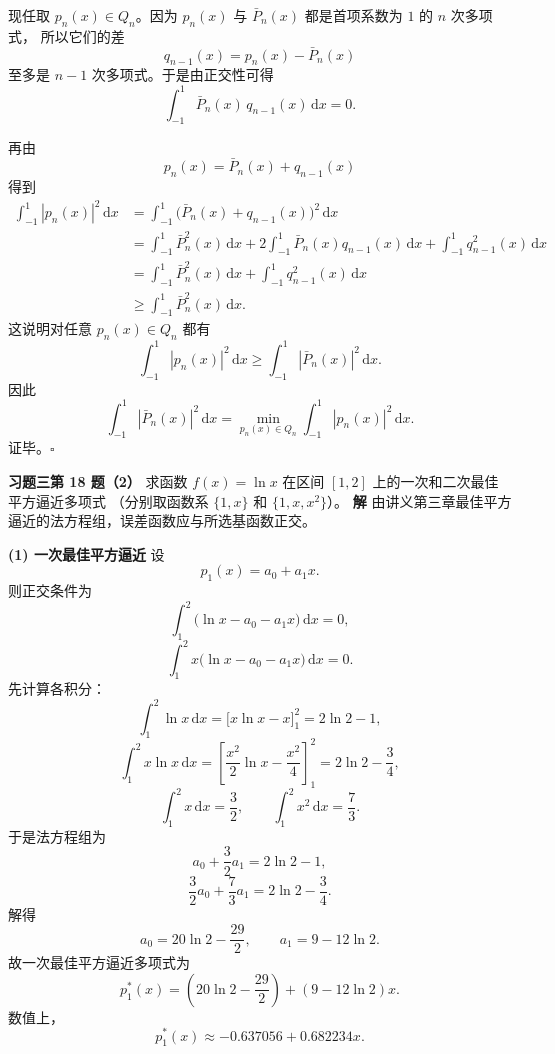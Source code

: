 \documentclass[UTF8,a4paper,11pt]{ctexart}
\newcommand*{\QED}{\hfill\ensuremath{\square}}
\begin{document}
现任取 $p_n(x)\in Q_n$。因为 $p_n(x)$ 与 $\bar P_n(x)$ 都是首项系数为 $1$ 的 $n$ 次多项式，
所以它们的差
\[
  q_{n-1}(x)=p_n(x)-\bar P_n(x)
\]
至多是 $n-1$ 次多项式。于是由正交性可得
\[
  \int_{-1}^1 \bar P_n(x)\,q_{n-1}(x)\,\mathrm{d}x=0.
\]

再由
\[
  p_n(x)=\bar P_n(x)+q_{n-1}(x)
\]
得到
\begin{align*}
  \int_{-1}^1 |p_n(x)|^2\,\mathrm{d}x
  &=\int_{-1}^1 \bigl(\bar P_n(x)+q_{n-1}(x)\bigr)^2\,\mathrm{d}x \\
  &=\int_{-1}^1 \bar P_n^2(x)\,\mathrm{d}x
    +2\int_{-1}^1 \bar P_n(x)q_{n-1}(x)\,\mathrm{d}x
    +\int_{-1}^1 q_{n-1}^2(x)\,\mathrm{d}x \\
  &=\int_{-1}^1 \bar P_n^2(x)\,\mathrm{d}x+\int_{-1}^1 q_{n-1}^2(x)\,\mathrm{d}x \\
  &\ge \int_{-1}^1 \bar P_n^2(x)\,\mathrm{d}x.
\end{align*}
这说明对任意 $p_n(x)\in Q_n$ 都有
\[
  \int_{-1}^1 |p_n(x)|^2\,\mathrm{d}x
  \ge
  \int_{-1}^1 |\bar P_n(x)|^2\,\mathrm{d}x.
\]
因此
\[
  \int_{-1}^1 |\bar P_n(x)|^2\,\mathrm{d}x
  =
  \min_{p_n(x)\in Q_n}\int_{-1}^1 |p_n(x)|^2\,\mathrm{d}x.
\]
证毕。\QED

\bigskip\bigskip

\noindent\textbf{习题三\quad 第 18 题（2）}\quad
求函数 $f(x)=\ln x$ 在区间 $[1,2]$ 上的一次和二次最佳平方逼近多项式
（分别取函数系 $\{1,x\}$ 和 $\{1,x,x^2\}$）。
\medskip
\noindent\textbf{解}\quad
由讲义第三章最佳平方逼近的法方程组，误差函数应与所选基函数正交。

\medskip
\noindent\textbf{(1) 一次最佳平方逼近}\quad
设
\[
  p_1(x)=a_0+a_1x.
\]
则正交条件为
\[
  \int_1^2 \bigl(\ln x-a_0-a_1x\bigr)\,\mathrm{d}x=0,
\]
\[
  \int_1^2 x\bigl(\ln x-a_0-a_1x\bigr)\,\mathrm{d}x=0.
\]
先计算各积分：
\[
  \int_1^2 \ln x\,\mathrm{d}x
  =\bigl[x\ln x-x\bigr]_1^2
  =2\ln2-1,
\]
\[
  \int_1^2 x\ln x\,\mathrm{d}x
  =\left[\frac{x^2}{2}\ln x-\frac{x^2}{4}\right]_1^2
  =2\ln2-\frac{3}{4},
\]
\[
  \int_1^2 x\,\mathrm{d}x=\frac{3}{2},\qquad
  \int_1^2 x^2\,\mathrm{d}x=\frac{7}{3}.
\]
于是法方程组为
\[
  a_0+\frac{3}{2}a_1=2\ln2-1,
\]
\[
  \frac{3}{2}a_0+\frac{7}{3}a_1=2\ln2-\frac{3}{4}.
\]
解得
\[
  a_0=20\ln2-\frac{29}{2},\qquad
  a_1=9-12\ln2.
\]
故一次最佳平方逼近多项式为
\[
  \boxed{
  p_1^*(x)=\left(20\ln2-\frac{29}{2}\right)+\left(9-12\ln2\right)x.}
\]
数值上，
\[
  p_1^*(x)\approx -0.637056+0.682234x.
\]
\end{document}
